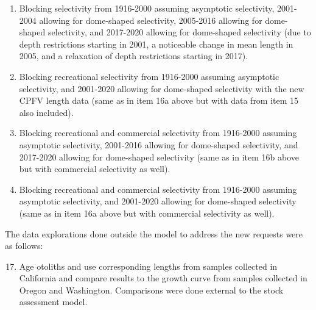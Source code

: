 \documentclass[11pt,
  english,
  letterpaper,
]{article}
\begin{document}
\begin{enumerate}
\begin{enumerate}
  \item Blocking selectivity from 1916-2000 assuming asymptotic selectivity, 2001-2004 allowing for dome-shaped selectivity, 2005-2016 allowing for dome-shaped selectivity, and 2017-2020 allowing for dome-shaped selectivity (due to depth restrictions starting in 2001, a noticeable change in mean length in 2005, and a relaxation of depth restrictions starting in 2017).
  
  \item Blocking recreational selectivity from 1916-2000 assuming asymptotic selectivity, and 2001-2020 allowing for dome-shaped selectivity with the new CPFV length data (same as in item 16a above but with data from item 15 also included).
  
  \item Blocking recreational and commercial selectivity from 1916-2000 assuming asymptotic selectivity, 2001-2016 allowing for dome-shaped selectivity, and 2017-2020 allowing for dome-shaped selectivity (same as in item 16b above but with commercial selectivity as well).
  
  \item Blocking recreational and commercial selectivity from 1916-2000 assuming asymptotic selectivity, and 2001-2020 allowing for dome-shaped selectivity (same as in item 16a above but with commercial selectivity as well).
  
  \end{enumerate}

\end{enumerate}


The data explorations done outside the model to address the new requests were as follows:

\leavevmode\tagmcend\tagstructend\par

\begin{enumerate}
\setcounter{enumi}{16}

  \item Age otoliths and use corresponding lengths from samples collected in California and compare results to the growth curve from samples collected in Oregon and Washington. Comparisons were done external to the stock assessment model.

\end{enumerate}

\end{document}
